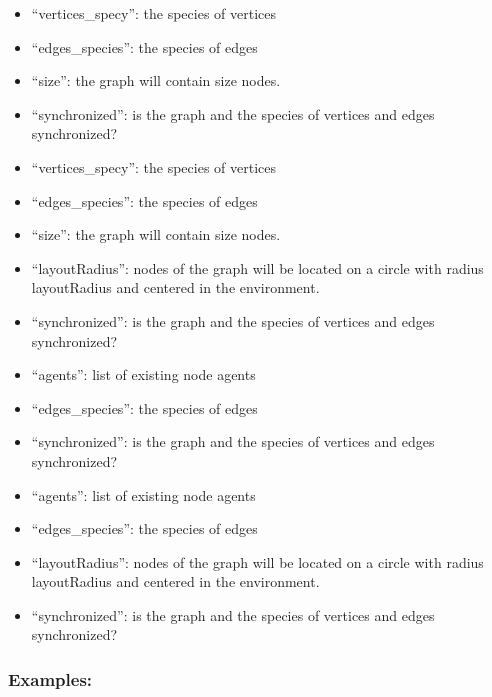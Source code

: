 \documentclass[]{book}
\providecommand{\tightlist}{%
  \setlength{\itemsep}{0pt}\setlength{\parskip}{0pt}}
\theoremstyle{definition}
\theoremstyle{definition}
\theoremstyle{definition}
\theoremstyle{remark}
\begin{document}
\begin{itemize}
\tightlist
\item
  ``vertices\_specy'': the species of vertices\\
\item
  ``edges\_species'': the species of edges\\
\item
  ``size'': the graph will contain size nodes.\\
\item
  ``synchronized'': is the graph and the species of vertices and edges
  synchronized?\\
\item
  ``vertices\_specy'': the species of vertices\\
\item
  ``edges\_species'': the species of edges\\
\item
  ``size'': the graph will contain size nodes.\\
\item
  ``layoutRadius'': nodes of the graph will be located on a circle with
  radius layoutRadius and centered in the environment.\\
\item
  ``synchronized'': is the graph and the species of vertices and edges
  synchronized?\\
\item
  ``agents'': list of existing node agents\\
\item
  ``edges\_species'': the species of edges\\
\item
  ``synchronized'': is the graph and the species of vertices and edges
  synchronized?\\
\item
  ``agents'': list of existing node agents\\
\item
  ``edges\_species'': the species of edges\\
\item
  ``layoutRadius'': nodes of the graph will be located on a circle with
  radius layoutRadius and centered in the environment.\\
\item
  ``synchronized'': is the graph and the species of vertices and edges
  synchronized?
\end{itemize}

\subsubsection{Examples:}\label{examples-137}
\end{document}
